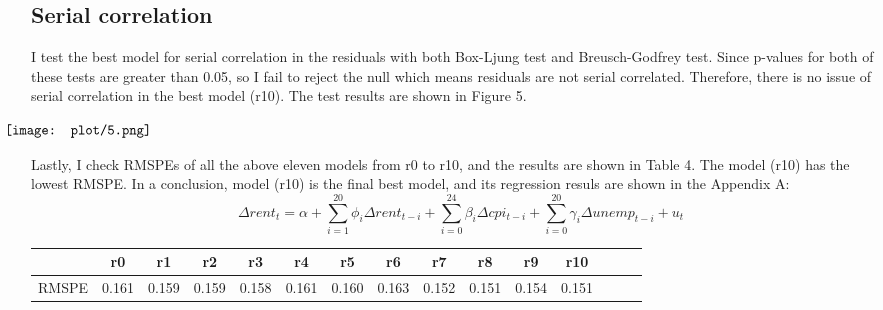 \documentclass[12pt, times]{article}
\renewcommand{\baselinestretch}{1.5}
\begin{document}
\subsection{Serial correlation}
I test the best model for serial correlation in the residuals with both Box-Ljung test and Breusch-Godfrey test. Since p-values for both of these tests are greater than 0.05, so I fail to reject the null which means residuals are not serial correlated. Therefore, there is no issue of serial correlation in the best model (r10). The test results are shown in Figure 5.
\begin{figure}[H]
  \begin{center}
    $
      \begin{array}
        [c]{cc}%
        \makebox[0pt]{\texttt{[image: plot/5.png]}}
      \end{array}
    $
  \end{center}
  \vspace{-1.5em}
  \caption{}
\end{figure}
\vspace{-1.5em}
Lastly, I check RMSPEs of all the above eleven models from r0 to r10, and the results are shown in Table 4. The model (r10) has the lowest RMSPE. In a conclusion, model (r10) is the final best model, and its regression resuls are shown in the Appendix A:
\begin{equation}
  \Delta rent_t = \alpha + \sum_{i=1}^{20} \phi_i \Delta rent_{t-i} + \sum_{i=0}^{24} \beta_i \Delta cpi_{t-i} + \sum_{i=0}^{20} \gamma_i \Delta unemp_{t-i} + u_t
\end{equation}

\renewcommand{\baselinestretch}{0.5}
\begin{scriptsize}
  \begin{center}
    \tabcolsep 10pt
    \begin{tabular}{lcccccccccccccc}
      \toprule
            & r0    & r1    & r2    & r3    & r4    & r5    & r6    & r7    & r8    & r9    & r10   \\
      \midrule
      RMSPE & 0.161 & 0.159 & 0.159 & 0.158 & 0.161 & 0.160 & 0.163 & 0.152 & 0.151 & 0.154 & 0.151 \\
      \bottomrule
    \end{tabular}
  \end{center}
\end{scriptsize}
\end{document}
